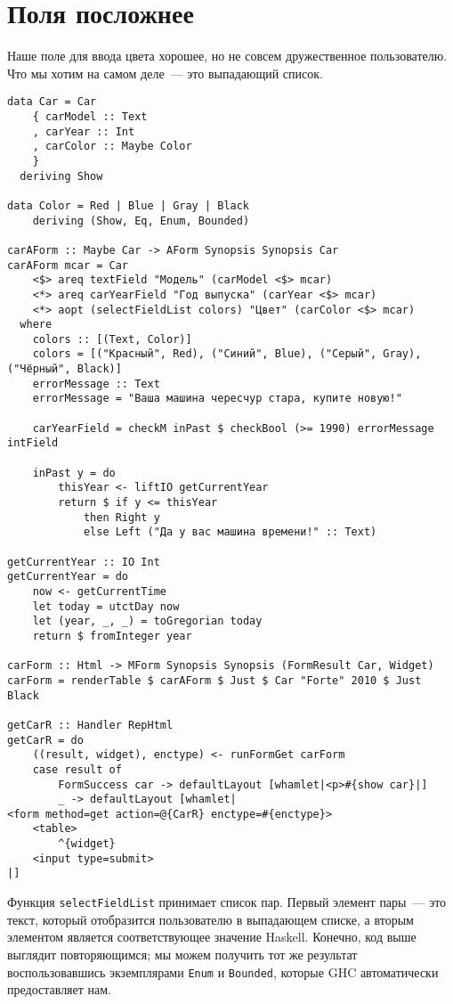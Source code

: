 \section{Поля посложнее}
Наше поле для ввода цвета хорошее, но не совсем дружественное пользователю.
Что мы хотим на самом деле~--- это выпадающий список.

\begin{lstlisting}[caption={Выпадающие списки}]
data Car = Car
    { carModel :: Text
    , carYear :: Int
    , carColor :: Maybe Color
    }
  deriving Show

data Color = Red | Blue | Gray | Black
    deriving (Show, Eq, Enum, Bounded)

carAForm :: Maybe Car -> AForm Synopsis Synopsis Car
carAForm mcar = Car
    <$> areq textField "Модель" (carModel <$> mcar)
    <*> areq carYearField "Год выпуска" (carYear <$> mcar)
    <*> aopt (selectFieldList colors) "Цвет" (carColor <$> mcar)
  where
    colors :: [(Text, Color)]
    colors = [("Красный", Red), ("Синий", Blue), ("Серый", Gray), ("Чёрный", Black)]
    errorMessage :: Text
    errorMessage = "Ваша машина чересчур стара, купите новую!"

    carYearField = checkM inPast $ checkBool (>= 1990) errorMessage intField

    inPast y = do
        thisYear <- liftIO getCurrentYear
        return $ if y <= thisYear
            then Right y
            else Left ("Да у вас машина времени!" :: Text)

getCurrentYear :: IO Int
getCurrentYear = do
    now <- getCurrentTime
    let today = utctDay now
    let (year, _, _) = toGregorian today
    return $ fromInteger year

carForm :: Html -> MForm Synopsis Synopsis (FormResult Car, Widget)
carForm = renderTable $ carAForm $ Just $ Car "Forte" 2010 $ Just Black

getCarR :: Handler RepHtml
getCarR = do
    ((result, widget), enctype) <- runFormGet carForm
    case result of
        FormSuccess car -> defaultLayout [whamlet|<p>#{show car}|]
        _ -> defaultLayout [whamlet|
<form method=get action=@{CarR} enctype=#{enctype}>
    <table>
        ^{widget}
    <input type=submit>
|]
\end{lstlisting}

Функция \lstinline'selectFieldList' принимает список пар. Первый элемент
пары~--- это текст, который отобразится пользователю в выпадающем списке, а
вторым элементом является соответствующее значение Haskell. Конечно, код выше
выглядит повторяющимся; мы можем получить тот же результат воспользовавшись
экземплярами \lstinline'Enum' и \lstinline'Bounded', которые GHC автоматически
предоставляет нам.

